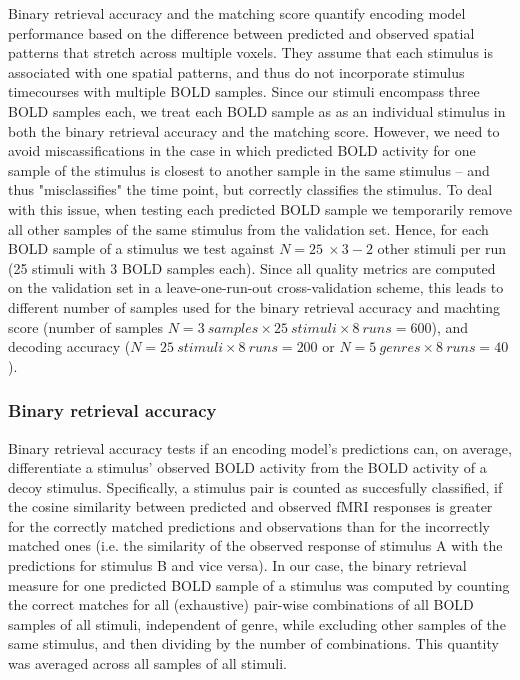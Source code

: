 Binary retrieval accuracy and the matching score quantify encoding model performance based on the difference between predicted and observed spatial patterns that stretch across multiple voxels. They assume that each stimulus is associated with one spatial patterns, and thus do not incorporate stimulus timecourses with multiple BOLD samples. Since our stimuli encompass three BOLD samples each, we treat each BOLD sample as as an individual stimulus in both the binary retrieval accuracy and the matching score. However, we need to avoid miscassifications in the case in which predicted BOLD activity for one sample of the stimulus is closest to another sample in the same stimulus -- and thus "misclassifies" the time point, but correctly classifies the stimulus. To deal with this issue, when testing each predicted BOLD sample we temporarily remove all other samples of the same stimulus from the validation set.
Hence, for each BOLD sample of a stimulus we test against $N = 25\:\times 3 - 2$ other stimuli per run (25 stimuli with 3 BOLD samples each).
Since all quality metrics are computed on the validation set in a leave-one-run-out cross-validation scheme, this leads to different number of samples used for the binary retrieval accuracy and machting score (number of samples $N = 3 \: samples \times 25 \: stimuli \times 8 \: runs = 600$), and decoding accuracy ($N = 25 \: stimuli \times 8 \: runs = 200$ or $N = 5 \: genres \times 8 \: runs = 40$).

\subsubsection*{Binary retrieval accuracy}
%
Binary retrieval accuracy \citep{ML08} tests if an encoding model's predictions can, on average, differentiate a stimulus' observed BOLD activity from the BOLD activity of a decoy stimulus. Specifically, a stimulus pair is counted as succesfully classified, if the cosine similarity between predicted and observed f{MRI} responses is greater for the correctly matched predictions and observations than for the incorrectly matched ones (i.e. the similarity of the observed response of stimulus A with the predictions for stimulus B and vice versa). In our case, the binary retrieval measure for one predicted BOLD sample of a stimulus was computed by counting the correct matches for all (exhaustive) pair-wise combinations of all BOLD samples of all stimuli, independent of genre, while excluding other samples of the same stimulus, and then dividing by the number of combinations. This quantity was averaged across all samples of all stimuli.

